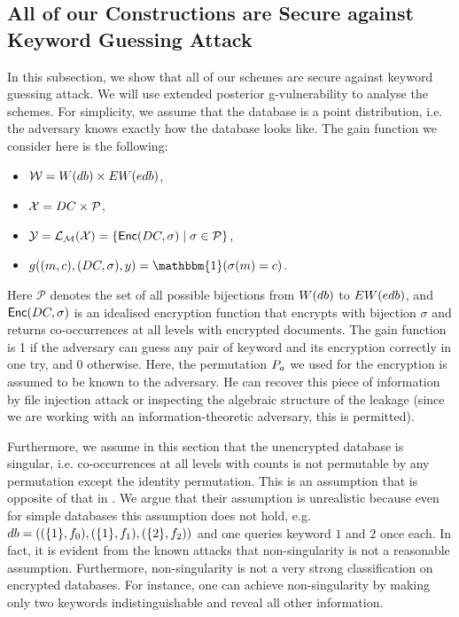 \subsection{All of our Constructions are Secure against Keyword Guessing Attack}
In this subsection, we show that all of our schemes are secure against keyword guessing attack. We will use extended posterior g-vulnerability to analyse the schemes. For simplicity, we assume that the database is a point distribution, i.e. the adversary knows exactly how the database looks like. The gain function we consider here is the following:
\begin{itemize}
	\item $\mathcal{W} = W(db) \times EW(edb)$,
	\item $\mathcal{X} = DC \times \mathcal{P}$,
	\item $\mathcal{Y} = \mathcal{L}_\mathcal{M}(\mathcal{X}) = \{\mathsf{Enc}(DC, \sigma) \mid \sigma \in \mathcal{P} \}$,
	\item $g((m,c), (\dcm, \sigma), y) = \mathbbm{1}(\sigma(m) = c)$.
\end{itemize}
Here $\mathcal{P}$ denotes the set of all possible bijections from $W(db)$ to $EW(edb)$, and $\mathsf{Enc}(DC, \sigma)$ is an idealised encryption function that encrypts with bijection $\sigma$ and returns co-occurrences at all levels with encrypted documents. The gain function is 1 if the adversary can guess any pair of keyword and its encryption correctly in one try, and 0 otherwise. Here, the permutation $P_a$ we used for the encryption is assumed to be known to the adversary. He can recover this piece of information by file injection attack or inspecting the algebraic structure of the leakage (since we are working with an information-theoretic adversary, this is permitted).

Furthermore, we assume in this section that the unencrypted database is singular, i.e. co-occurrences at all levels with counts is not permutable by any permutation except the identity permutation. This is an assumption that is opposite of that in \cite{CCS:CGKO06}. We argue that their assumption is unrealistic because even for simple databases this assumption does not hold, e.g. $db = ((\{1\}, f_0), (\{1\}, f_1), (\{2\}, f_2))$ and one queries keyword $1$ and $2$ once each. In fact, it is evident from the known attacks that non-singularity is not a reasonable assumption. Furthermore, non-singularity is not a very strong classification on encrypted databases. For instance, one can achieve non-singularity by making only two keywords indistinguishable and reveal all other information.


